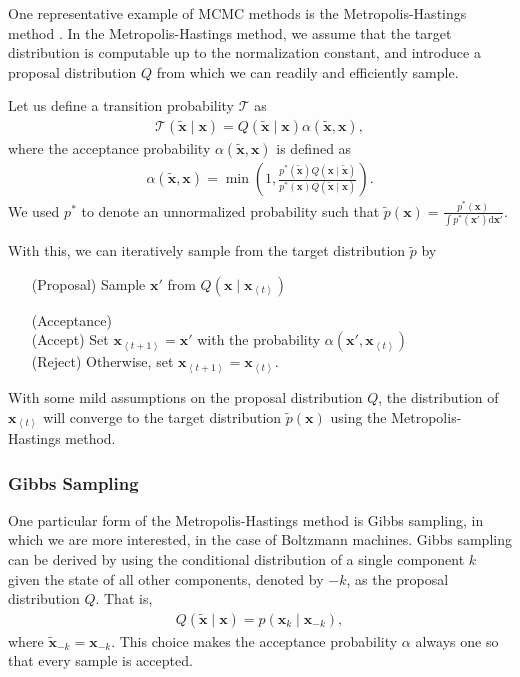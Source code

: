 \documentclass[dissertation,nocontribution,draft*]{aaltoseries}
\newcommand{\qt}[1]{\left<#1\right>}
\newcommand{\vect}[1]{\mathbf{#1}}
\newcommand{\vx}[0]{\vect{x}}
\newcommand{\T}[0]{\mathcal{T}}
\newcommand{\dd}[1]{\text{d}{#1}}
\begin{document}
One representative example of MCMC methods is
the Metropolis-Hastings method \citep{Hastings1970}. In the
Metropolis-Hastings method, we assume that the target
distribution is computable up to the normalization constant,
and introduce a proposal distribution $Q$ from which we can
readily and efficiently sample.

Let us define a transition probability $\T$ as
\begin{align*}
    \T(\tilde{\vx} \mid \vx) = Q(\tilde{\vx}\mid \vx)
    \alpha(\tilde{\vx}, \vx),
\end{align*}
where the acceptance probability $\alpha(\tilde{\vx}, \vx)$ is
defined as
\begin{align*}
    \alpha(\tilde{\vx}, \vx) = \min \left(1, 
    \frac{p^*(\tilde{\vx})Q(\vx \mid \tilde{\vx})}
    {p^*(\vx)Q(\tilde{\vx} \mid \vx)} \right).
\end{align*}
We used $p^*$ to denote an unnormalized probability
such that
$\tilde{p}(\vx) = \tfrac{p^*(\vx)}{\int p^*(\vx') \dd{\vx'}}$.

With this, we can iteratively sample from the target
distribution $\tilde{p}$ by
\begin{itemize}
    \itemsep 0em
    \item[(Proposal)] Sample $\vx'$ from $Q(\vx \mid
        \vx_{\qt{t}})$
    \item[(Acceptance)] ~\\ 
        (Accept) Set $\vx_{\qt{t+1}} = \vx'$ with the
        probability $\alpha(\vx', \vx_{\qt{t}})$  \\
        (Reject) Otherwise, set $\vx_{\qt{t+1}} =
        \vx_{\qt{t}}$.
\end{itemize}
With some mild assumptions on the proposal distribution $Q$,
the distribution of $\vx_{\qt{t}}$ will converge to the target
distribution $\tilde{p}(\vx)$ using the Metropolis-Hastings
method.

\subsubsection{Gibbs Sampling}
\label{sec:gibbs}

One particular form of the Metropolis-Hastings method is
Gibbs sampling, in which we are more interested, in the case
of Boltzmann machines. Gibbs sampling can be derived by
using the conditional distribution of a single component $k$
given the state of all other components, denoted by $-k$, as
the proposal distribution $Q$. That is,
\begin{align*}
    Q(\tilde{\vx} \mid \vx) = p(\vx_k \mid \vx_{-k}),
\end{align*}
where $\tilde{\vx}_{-k} = \vx_{-k}$.
This choice makes the acceptance probability $\alpha$ always
one so that every sample is accepted.
\end{document}
